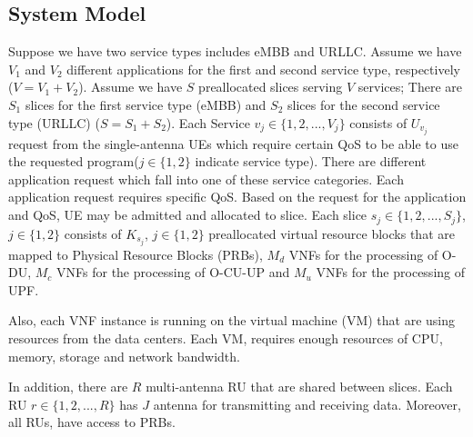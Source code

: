 \documentclass[conference]{IEEEtran}
\begin{document}
\subsection{System Model}
Suppose we have two service types includes eMBB and URLLC. Assume we have $V_1$ and $V_2$ different applications for the first and second service type, respectively ($V = V_1 + V_2$).
Assume we have $S$ preallocated slices serving $V$ services; There are $S_1$ slices for the first service type (eMBB) and $S_2$ slices for the second service type (URLLC) ($S = S_1 + S_2$).
Each Service $v_j\in \{1,2,...,V_j \} $ consists of $U_{v_j}$ request from the 
single-antenna UEs which require certain QoS to be able to use the requested program($j \in \{1,2\}$ indicate service type).
There are different application request which fall into one of these service categories. Each application request requires specific QoS. Based on the request for the application and QoS, UE may be admitted and allocated to slice.
Each slice $s_j \in \{1,2,...,S_j \}$, $j \in \{1,2\}$ consists of $K_{s_j}$, $j \in \{1,2\}$ preallocated virtual resource blocks that are mapped to Physical Resource Blocks (PRBs), $M_{d}$ VNFs for the processing of O-DU,  $M_{c}$ VNFs for the processing of O-CU-UP and $M_{u}$ VNFs for the processing of UPF.

Also, each VNF instance is running on the virtual machine (VM) that are using resources from the data centers. Each VM, requires enough resources of CPU, memory, storage and network bandwidth.

In addition, there are $R$ multi-antenna RU that are shared between slices. Each RU $r \in \{1,2,...,R \}$
has $J$ antenna for transmitting and receiving data. Moreover, all RUs, have access to PRBs.
\end{document}

